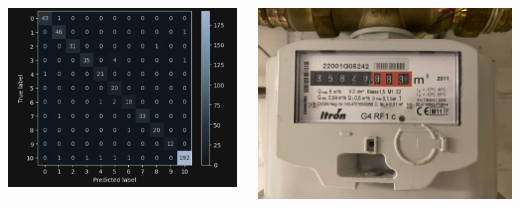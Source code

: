 \documentclass[25pt,a0paper, portrait]{tikzposter}
\begin{document}
	\begin{columns} 
		
		{
			{
				\begin{tikzfigure}
					\includegraphics[width=\linewidth,keepaspectratio]{images/ConfusionMatrix}
				\end{tikzfigure}
				
			}
			{
				\begin{tikzfigure}
					\includegraphics[width=20cm]{images/watermeter}
				\end{tikzfigure}	
			}
		}
		

\end{columns}
\end{document}

